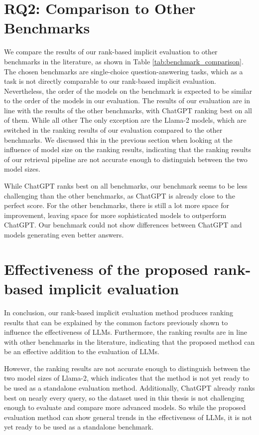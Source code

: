 \section{RQ2: Comparison to Other Benchmarks}
We compare the results of our rank-based implicit evaluation to other benchmarks in the literature, as shown in Table \ref{tab:benchmark_comparison}.
The chosen benchmarks are single-choice question-answering tasks, which as a task is not directly comparable to our rank-based implicit evaluation.
Nevertheless, the order of the models on the benchmark is expected to be similar to the order of the models in our evaluation.
The results of our evaluation are in line with the results of the other benchmarks, with ChatGPT ranking best on all of them.
While all other
The only exception are the Llama-2 models, which are switched in the ranking results of our evaluation compared to the other benchmarks.
We discussed this in the previous section when looking at the influence of model size on the ranking results, indicating that the ranking results of our retrieval pipeline are not accurate enough to distinguish between the two model sizes.

While ChatGPT ranks best on all benchmarks, our benchmark seems to be less challenging than the other benchmarks, as ChatGPT is already close to the perfect score.
For the other benchmarks, there is still a lot more space for improvement, leaving space for more sophisticated models to outperform ChatGPT.
Our benchmark could not show differences between ChatGPT and models generating even better answers.

\section{Effectiveness of the proposed rank-based implicit evaluation}
In conclusion, our rank-based implicit evaluation method produces ranking results that can be explained by the common factors previously shown to influence the effectiveness of LLMs.
Furthermore, the ranking results are in line with other benchmarks in the literature, indicating that the proposed method can be an effective addition to the evaluation of LLMs.

However, the ranking results are not accurate enough to distinguish between the two model sizes of Llama-2, which indicates that the method is not yet ready to be used as a standalone evaluation method.
Additionally, ChatGPT already ranks best on nearly every query, so the dataset used in this thesis is not challenging enough to evaluate and compare more advanced models.
So while the proposed evaluation method can show general trends in the effectiveness of LLMs, it is not yet ready to be used as a standalone benchmark.

